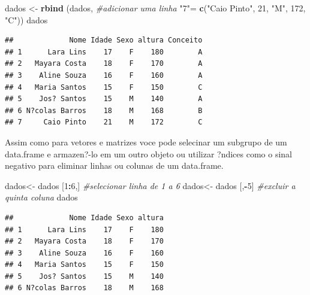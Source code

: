 \documentclass[]{book}
\newenvironment{Shaded}{\begin{snugshade}}{\end{snugshade}}
\newcommand{\CommentTok}[1]{\textcolor[rgb]{0.56,0.35,0.01}{\textit{#1}}}
\newcommand{\DecValTok}[1]{\textcolor[rgb]{0.00,0.00,0.81}{#1}}
\newcommand{\KeywordTok}[1]{\textcolor[rgb]{0.13,0.29,0.53}{\textbf{#1}}}
\newcommand{\NormalTok}[1]{#1}
\newcommand{\OperatorTok}[1]{\textcolor[rgb]{0.81,0.36,0.00}{\textbf{#1}}}
\newcommand{\StringTok}[1]{\textcolor[rgb]{0.31,0.60,0.02}{#1}}
\begin{document}
\begin{Shaded}
\begin{Highlighting}[]
\NormalTok{dados <-}\StringTok{ }\KeywordTok{rbind}\NormalTok{ (dados, }\CommentTok{#adicionar uma linha}
                \StringTok{"7"}\NormalTok{=}\StringTok{ }\KeywordTok{c}\NormalTok{(}\StringTok{"Caio Pinto"}\NormalTok{, }\DecValTok{21}\NormalTok{, }\StringTok{"M"}\NormalTok{, }\DecValTok{172}\NormalTok{, }\StringTok{"C"}\NormalTok{))}
\NormalTok{dados}
\end{Highlighting}
\end{Shaded}

\begin{verbatim}
##             Nome Idade Sexo altura Conceito
## 1      Lara Lins    17    F    180        A
## 2   Mayara Costa    18    F    170        A
## 3    Aline Souza    16    F    160        A
## 4   Maria Santos    15    F    150        C
## 5    Jos? Santos    15    M    140        A
## 6 N?colas Barros    18    M    168        B
## 7     Caio Pinto    21    M    172        C
\end{verbatim}

Assim como para vetores e matrizes voce pode selecinar um subgrupo de um data.frame e armazen?-lo em um outro objeto ou utilizar ?ndices como o sinal negativo para eliminar linhas ou colunas de um data.frame.

\begin{Shaded}
\begin{Highlighting}[]
\NormalTok{dados<-}\StringTok{ }\NormalTok{dados [}\DecValTok{1}\OperatorTok{:}\DecValTok{6}\NormalTok{,] }\CommentTok{#selecionar linha de 1 a 6}
\NormalTok{dados<-}\StringTok{ }\NormalTok{dados [,}\OperatorTok{-}\DecValTok{5}\NormalTok{] }\CommentTok{#excluir a quinta coluna}
\NormalTok{dados}
\end{Highlighting}
\end{Shaded}

\begin{verbatim}
##             Nome Idade Sexo altura
## 1      Lara Lins    17    F    180
## 2   Mayara Costa    18    F    170
## 3    Aline Souza    16    F    160
## 4   Maria Santos    15    F    150
## 5    Jos? Santos    15    M    140
## 6 N?colas Barros    18    M    168
\end{verbatim}

\begin{Shaded}
\end{Shaded}
\end{document}
